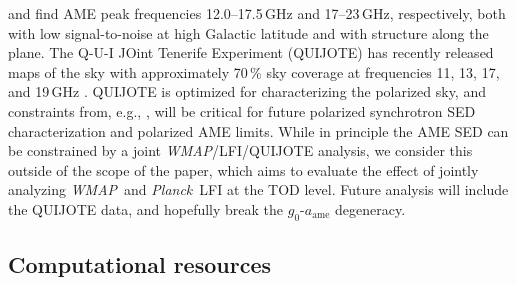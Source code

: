\documentclass[twocolumn]{../../common/aa}
\def\WMAP{\emph{WMAP}}
\def\Planck{\emph{Planck}}
\def\commander{\texttt{Commander}}
\newcommand{\K}[0]{\textit K}
\begin{document}
\citet{bennett2012} and \citet{planck2014-a12} find AME peak frequencies 12.0--17.5\,GHz and 17--23\,GHz, respectively, both with low signal-to-noise at high Galactic latitude and with structure along the plane. The Q-U-I JOint Tenerife Experiment (QUIJOTE) has recently released maps of the sky with approximately 70\,\% sky coverage at frequencies 11, 13, 17, and 19\,GHz \citep{QUIJOTE_IV}. QUIJOTE is optimized for characterizing the polarized sky, and constraints from, e.g., \citet{QUIJOTE_VIII}, will be critical for future polarized synchrotron SED characterization and polarized AME limits. While in principle the AME SED can be constrained by a joint \WMAP/LFI/QUIJOTE analysis, we consider this outside of the scope of the paper, which aims to evaluate the effect of jointly analyzing \WMAP\ and \Planck\ LFI at the TOD level.  Future analysis will include the QUIJOTE data, and hopefully break the $g_0$-$a_\mathrm{ame}$ degeneracy.



\subsection{Computational resources}
\label{sec:resources}
\end{document}
